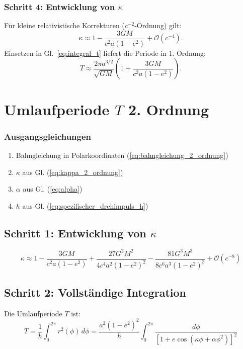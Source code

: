 \subsubsection*{Schritt 4: Entwicklung von $\kappa$}
Für kleine relativistische Korrekturen ($c^{-2}$-Ordnung) gilt:
\begin{equation}
    \kappa \approx 1 - \frac{3GM}{c^2 a(1-e^2)} + \mathcal{O}(c^{-4}).
\end{equation}
Einsetzen in Gl.~\eqref{eq:integral_t} liefert die Periode in 1. Ordnung:
\begin{equation}
    \boxed{
    T \approx \frac{2\pi a^{3/2}}{\sqrt{GM}} \left(1 + \frac{3GM}{c^2 a(1-e^2)}\right).
    }
\end{equation}

\newpage
\section{Umlaufperiode \( T \) 2. Ordnung}

\subsubsection*{Ausgangsgleichungen}
\begin{enumerate}
    \item Bahngleichung in Polarkoordinaten (\ref{eq:bahngleichung_2_ordnung})
    \item $\kappa$ aus Gl. (\ref{eq:kappa_2_ordnung})
    \item $\alpha$ aus Gl. (\ref{eq:alpha})
    \item $h$ aus Gl. (\ref{eq:spezifischer_drehimpuls_h})
\end{enumerate}

\subsection*{Schritt 1: Entwicklung von \(\kappa\)}
\begin{equation}
\kappa \approx 1 - \frac{3GM}{c^2a(1-e^2)} + \frac{27G^2M^2}{4c^4a^2(1-e^2)^2} - \frac{81G^3M^3}{8c^6a^3(1-e^2)^3} + \mathcal{O}(c^{-8}) 
\end{equation}

\subsection*{Schritt 2: Vollständige Integration}
Die Umlaufperiode \( T \) ist:
\begin{equation}
T = \frac{1}{h} \int_0^{2\pi} r^2(\phi) \, d\phi = \frac{a^2(1-e^2)^2}{h} \int_0^{2\pi} \frac{d\phi}{\left[1 + e\cos\left(\kappa\phi + \alpha\phi^2\right)\right]^2}
\end{equation}

